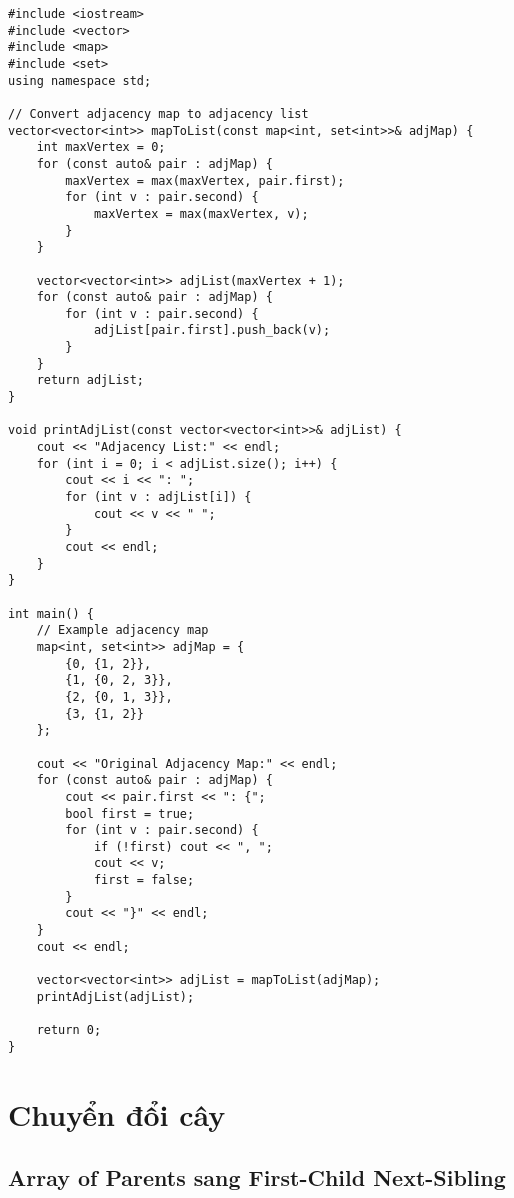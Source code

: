 \documentclass[12pt]{article}
\begin{document}
\begin{lstlisting}[caption={Chuyển đổi từ Adjacency Map sang Danh sách kề}]
#include <iostream>
#include <vector>
#include <map>
#include <set>
using namespace std;

// Convert adjacency map to adjacency list
vector<vector<int>> mapToList(const map<int, set<int>>& adjMap) {
    int maxVertex = 0;
    for (const auto& pair : adjMap) {
        maxVertex = max(maxVertex, pair.first);
        for (int v : pair.second) {
            maxVertex = max(maxVertex, v);
        }
    }
    
    vector<vector<int>> adjList(maxVertex + 1);
    for (const auto& pair : adjMap) {
        for (int v : pair.second) {
            adjList[pair.first].push_back(v);
        }
    }
    return adjList;
}

void printAdjList(const vector<vector<int>>& adjList) {
    cout << "Adjacency List:" << endl;
    for (int i = 0; i < adjList.size(); i++) {
        cout << i << ": ";
        for (int v : adjList[i]) {
            cout << v << " ";
        }
        cout << endl;
    }
}

int main() {
    // Example adjacency map
    map<int, set<int>> adjMap = {
        {0, {1, 2}},
        {1, {0, 2, 3}},
        {2, {0, 1, 3}},
        {3, {1, 2}}
    };
    
    cout << "Original Adjacency Map:" << endl;
    for (const auto& pair : adjMap) {
        cout << pair.first << ": {";
        bool first = true;
        for (int v : pair.second) {
            if (!first) cout << ", ";
            cout << v;
            first = false;
        }
        cout << "}" << endl;
    }
    cout << endl;
    
    vector<vector<int>> adjList = mapToList(adjMap);
    printAdjList(adjList);
    
    return 0;
}
\end{lstlisting}

\section{Chuyển đổi cây}

\subsection{Array of Parents sang First-Child Next-Sibling}
\end{document}
